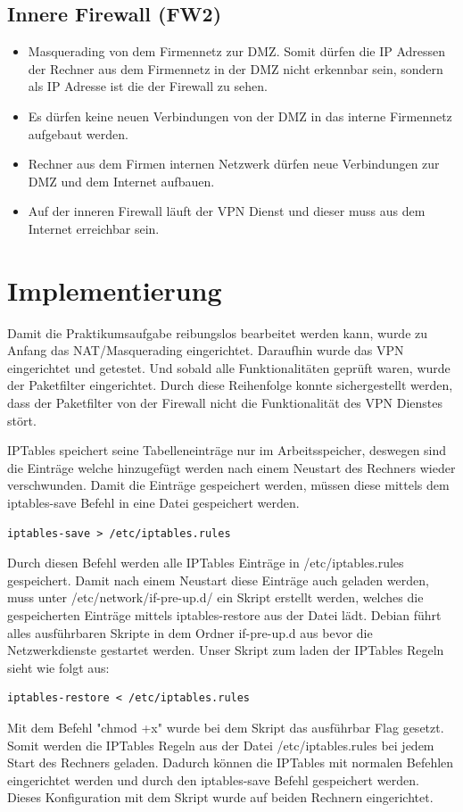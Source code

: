 \subsection{Innere Firewall (FW2)}
\begin{itemize}
\item Masquerading von dem Firmennetz zur DMZ. Somit dürfen die IP Adressen der Rechner aus dem Firmennetz in der DMZ nicht erkennbar sein, sondern als IP Adresse ist die der Firewall zu sehen.
\item Es dürfen keine neuen Verbindungen von der DMZ in das interne Firmennetz aufgebaut werden.
\item Rechner aus dem Firmen internen Netzwerk dürfen neue Verbindungen zur DMZ und dem Internet aufbauen.
\item Auf der inneren Firewall läuft der VPN Dienst und dieser muss aus dem Internet erreichbar sein.	
\end{itemize}

\section{Implementierung}
Damit die Praktikumsaufgabe reibungslos bearbeitet werden kann, wurde zu Anfang das NAT/Masquerading eingerichtet. Daraufhin wurde das VPN eingerichtet und getestet. Und sobald alle Funktionalitäten geprüft waren, wurde der Paketfilter eingerichtet. Durch diese Reihenfolge konnte sichergestellt werden, dass der Paketfilter von der Firewall nicht die Funktionalität des VPN Dienstes stört.

IPTables speichert seine Tabelleneinträge nur im Arbeitsspeicher, deswegen sind die Einträge welche hinzugefügt werden nach einem Neustart des Rechners wieder verschwunden. Damit die Einträge gespeichert werden, müssen diese mittels dem iptables-save Befehl in eine Datei gespeichert werden. 
\begin{lstlisting}
iptables-save > /etc/iptables.rules
\end{lstlisting}
Durch diesen Befehl werden alle IPTables Einträge in /etc/iptables.rules gespeichert. Damit nach einem Neustart diese Einträge auch geladen werden, muss unter /etc/network/if-pre-up.d/ ein Skript erstellt werden, welches die gespeicherten Einträge mittels iptables-restore aus der Datei lädt. Debian führt alles ausführbaren Skripte in dem Ordner if-pre-up.d aus bevor die Netzwerkdienste gestartet werden. Unser Skript zum laden der IPTables Regeln sieht wie folgt aus:
\begin{lstlisting}[caption={/etc/network/if-pre-up.d/iptables}]
iptables-restore < /etc/iptables.rules
\end{lstlisting}
Mit dem Befehl "chmod +x" wurde bei dem Skript das ausführbar Flag gesetzt. Somit werden die IPTables Regeln aus der Datei /etc/iptables.rules bei jedem Start des Rechners geladen. Dadurch können die IPTables mit normalen Befehlen eingerichtet werden und durch den iptables-save Befehl gespeichert werden. Dieses Konfiguration mit dem Skript wurde auf beiden Rechnern eingerichtet.

